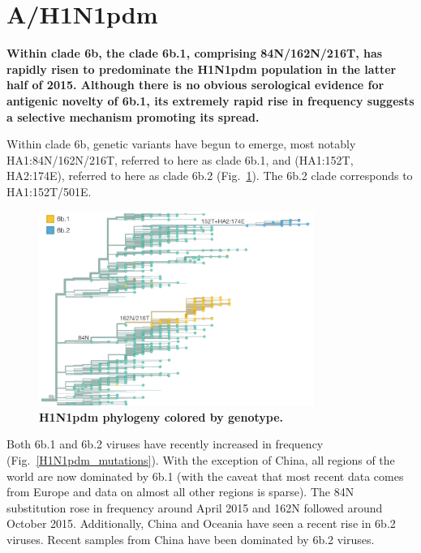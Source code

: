 \documentclass[11pt,oneside,letterpaper]{article}
\begin{document}
\clearpage
\pagebreak

\section*{A/H1N1pdm}

\textbf{Within clade 6b, the clade 6b.1, comprising 84N/162N/216T, has rapidly risen to predominate the H1N1pdm population in the latter half of 2015. Although there is no obvious serological evidence for antigenic novelty of 6b.1, its extremely rapid rise in frequency suggests a selective mechanism promoting its spread.}

Within clade 6b, genetic variants have begun to emerge, most notably HA1:84N/162N/216T, referred to here as clade 6b.1, and (HA1:152T, HA2:174E), referred to here as clade 6b.2 (Fig.\ \ref{H1N1pdm_tree}). The 6b.2 clade corresponds to HA1:152T/501E.

\begin{figure}[h!]
	\centering		
	\includegraphics[width=0.8\textwidth]{../figures/feb-2016/H1N1pdm_tree.png}
	\caption{\textbf{H1N1pdm phylogeny colored by genotype.} 
	}
	\label{H1N1pdm_tree}
\end{figure}

\pagebreak

Both 6b.1 and 6b.2 viruses have recently increased in frequency (Fig.\ \ref{H1N1pdm_mutations}). With the exception of China, all regions of the world are now dominated by 6b.1 (with the caveat that most recent data comes from Europe and data on almost all other regions is sparse). The 84N substitution rose in frequency around April 2015 and 162N followed around October 2015. Additionally, China and Oceania have seen a recent rise in 6b.2 viruses. Recent samples from China have been dominated by 6b.2 viruses.
\end{document}
